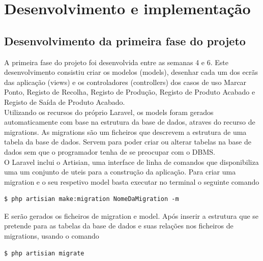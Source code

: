 \chapter{Desenvolvimento e implementação} 
\label{cap:5}


\section{Desenvolvimento da primeira fase do projeto}
A primeira fase do projeto foi desenvolvida entre as semanas 4 e 6. Este desenvolvimento consistiu criar os modelos (models), desenhar cada um dos ecrãs das aplicação (views) e os controladores (controllers) dos casos de uso Marcar Ponto, Registo de Recolha, Registo de Produção, Registo de Produto Acabado e Registo de Saída de Produto Acabado.\\
Utilizando os recursos do próprio Laravel, os models foram gerados automaticamente com base na estrutura da base de dados, atraves do recurso de migrations. As migrations são um ficheiros que descrevem a estrutura de uma tabela da base de dados. Servem para poder criar ou alterar tabelas na base de dados sem que o programador tenha de se preocupar com o DBMS\label{sym:DBMG}.\\
O Laravel inclui o Artisian, uma interface de linha de comandos que disponibiliza uma um conjunto de uteis para a construção da aplicação\cite{Laravel}.
Para criar uma migration e o seu respetivo model basta executar no terminal o seguinte comando

\begin{lstlisting}
$ php artisian make:migration NomeDaMigration -m
\end{lstlisting}

\noindent
E serão gerados os ficheiros de migration e model. Após inserir a estrutura que se pretende para as tabelas da base de dados e suas relações nos ficheiros de migrations, usando o comando

\begin{lstlisting}
$ php artisian migrate
\end{lstlisting}

